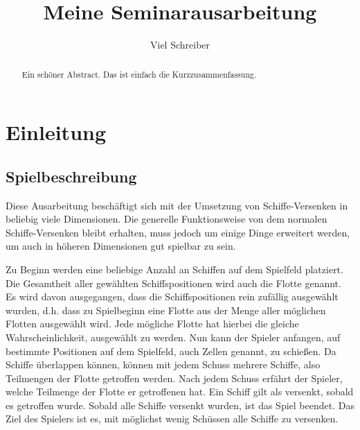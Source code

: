 \documentclass[a4paper,12pt]{llncs}
\numberwithin{equation}{section}
\begin{document}

\author{Viel Schreiber}

\title{Meine Seminarausarbeitung}

\maketitle

\thispagestyle{empty}

\begin{abstract}
Ein schöner Abstract. Das ist einfach die Kurzzusammenfassung.
\end{abstract}

\section{Einleitung}

\subsection{Spielbeschreibung}
Diese Ausarbeitung beschäftigt sich mit der Umsetzung von Schiffe-Versenken in beliebig viele Dimensionen.
Die generelle Funktionsweise von dem normalen Schiffe-Versenken bleibt erhalten, muss jedoch um einige Dinge erweitert werden, um auch in höheren Dimensionen gut spielbar zu sein.

Zu Beginn werden eine beliebige Anzahl an Schiffen auf dem Spielfeld platziert.
Die Gesamtheit aller gewählten Schiffspositionen wird auch die Flotte genannt.
Es wird davon ausgegangen, dass die Schiffspositionen rein zufällig ausgewählt wurden, d.h. dass zu Spielbeginn eine Flotte aus der Menge aller möglichen Flotten ausgewählt wird. Jede mögliche Flotte hat hierbei die gleiche Wahrscheinlichkeit, ausgewählt zu werden.
Nun kann der Spieler anfangen, auf bestimmte Positionen auf dem Spielfeld, auch Zellen genannt, zu schießen.
Da Schiffe überlappen können, können mit jedem Schuss mehrere Schiffe, also Teilmengen der Flotte getroffen werden.
Nach jedem Schuss erfährt der Spieler, welche Teilmenge der Flotte er getroffenen hat.
Ein Schiff gilt als versenkt, sobald es getroffen wurde.
Sobald alle Schiffe versenkt wurden, ist das Spiel beendet.
Das Ziel des Spielers ist es, mit möglichst wenig Schüssen alle Schiffe zu versenken.
\end{document}
